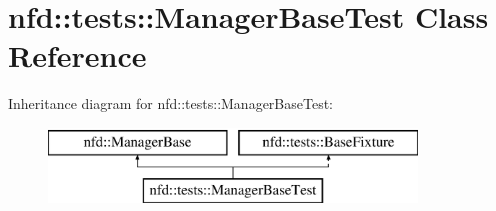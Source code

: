 \hypertarget{classnfd_1_1tests_1_1ManagerBaseTest}{}\section{nfd\+:\+:tests\+:\+:Manager\+Base\+Test Class Reference}
\label{classnfd_1_1tests_1_1ManagerBaseTest}
Inheritance diagram for nfd\+:\+:tests\+:\+:Manager\+Base\+Test\+:\begin{figure}[H]
\begin{center}
\leavevmode
\includegraphics[height=2.000000cm]{classnfd_1_1tests_1_1ManagerBaseTest}
\end{center}
\end{figure}
